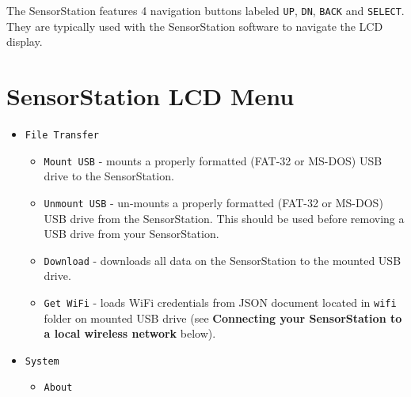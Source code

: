 \documentclass[
]{article}
\providecommand{\tightlist}{%
  \setlength{\itemsep}{0pt}\setlength{\parskip}{0pt}}
\begin{document}
The SensorStation features 4 navigation buttons labeled \texttt{UP},
\texttt{DN}, \texttt{BACK} and \texttt{SELECT}. They are typically used
with the SensorStation software to navigate the LCD display.

\hypertarget{sensorstation-lcd-menu}{%
\section{SensorStation LCD Menu}\label{sensorstation-lcd-menu}}

\begin{itemize}
\tightlist
\item
  \texttt{File\ Transfer}

  \begin{itemize}
  \tightlist
  \item
    \texttt{Mount\ USB} - mounts a properly formatted (FAT-32 or MS-DOS)
    USB drive to the SensorStation.
  \item
    \texttt{Unmount\ USB} - un-mounts a properly formatted (FAT-32 or
    MS-DOS) USB drive from the SensorStation. This should be used before
    removing a USB drive from your SensorStation.
  \item
    \texttt{Download} - downloads all data on the SensorStation to the
    mounted USB drive.
  \item
    \texttt{Get\ WiFi} - loads WiFi credentials from JSON document
    located in \texttt{wifi} folder on mounted USB drive (see
    \textbf{Connecting your SensorStation to a local wireless network}
    below).
  \end{itemize}
\item
  \texttt{System}

  \begin{itemize}
  \tightlist
  \item
    \texttt{About}


\end{itemize}
\end{itemize}
\end{document}
